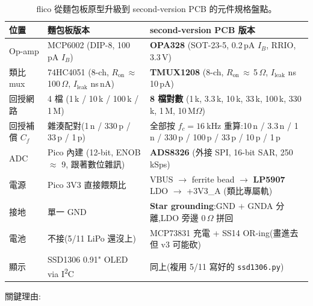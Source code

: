 \begin{table}[H]
  \centering
  \caption{flico 從麵包板原型升級到 second-version PCB 的元件規格盤點。}
  \label{tab:0518-spec}
  \small
  \begin{tabular}{lll}
    \toprule
    位置 & 麵包板版本 & second-version PCB 版本 \\
    \midrule
    Op-amp     & MCP6002 (DIP-8, 100\,pA $I_B$)
               & \textbf{OPA328} (SOT-23-5, 0.2\,pA $I_B$, RRIO, 3.3\,V) \\
    類比 mux   & 74HC4051 (8-ch, $R_\text{on}$\,$\approx$\,100\,\(\Omega\), \(I_\text{leak}\) ns\,nA)
               & \textbf{TMUX1208} (8-ch, $R_\text{on}$\,$\approx$\,5\,\(\Omega\), \(I_\text{leak}\) ns\,10\,pA) \\
    回授網路   & 4 檔 (1\,k / 10\,k / 100\,k / 1\,M)
               & \textbf{8 檔對數} (1\,k, 3.3\,k, 10\,k, 33\,k, 100\,k, 330\,k, 1\,M, 10\,M\(\Omega\)) \\
    回授補償 $C_f$ & 雜湊配對(1\,n / 330\,p / 33\,p / 1\,p)
               & 全部按 \(f_c=\SI{16}{\kilo\hertz}\) 重算:10\,n / 3.3\,n / 1\,n / 330\,p / 100\,p / 33\,p / 10\,p / 1\,p \\
    ADC        & Pico 內建 (12-bit, ENOB $\approx$ 9, 跟著數位雜訊)
               & \textbf{ADS8326} (外接 SPI, 16-bit SAR, 250\,kSps) \\
    電源       & Pico 3V3 直接餵類比
               & VBUS \(\to\) ferrite bead \(\to\) \textbf{LP5907} LDO \(\to\) +3V3\_A (類比專屬軌) \\
    接地       & 單一 GND
               & \textbf{Star grounding}:GND \(+\) GNDA 分離,LDO 旁邊 0\,\(\Omega\) 拼回 \\
    電池       & 不接(5/11 LiPo 還沒上)
               & MCP73831 充電 + SS14 OR-ing(畫進去但 v3 可能砍) \\
    顯示       & SSD1306 0.91" OLED via I\textsuperscript{2}C
               & 同上(複用 5/11 寫好的 \texttt{ssd1306.py}) \\
    \bottomrule
  \end{tabular}
\end{table}

關鍵理由:

